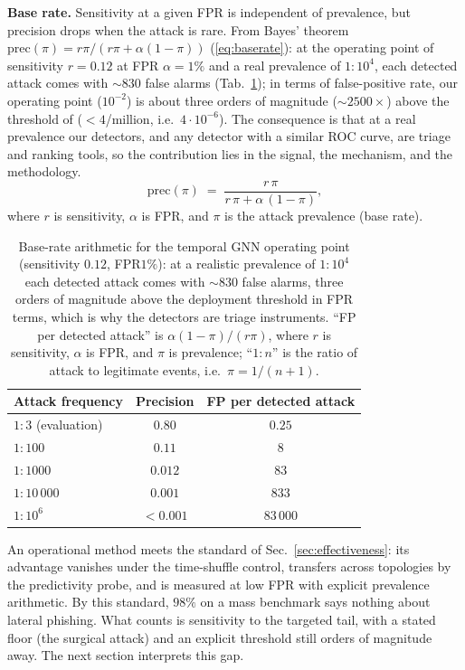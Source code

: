 \smallskip\noindent\textbf{Base rate.} Sensitivity at a given FPR is independent of prevalence, but
precision drops when the attack is rare. From Bayes' theorem
$\mathrm{prec}(\pi)=r\pi/(r\pi+\alpha(1-\pi))$
(\ref{eq:baserate}): at the operating point of sensitivity $r{=}0.12$ at FPR $\alpha{=}1\%$ and a real prevalence of
$1{:}10^4$, each detected attack comes with $\sim\!830$ false alarms (Tab.~\ref{tab:baserate}); in terms of
false-positive rate, our operating point ($10^{-2}$) is about three orders of magnitude ($\sim\!2500\times$)
above the threshold of \citet{ho2019detecting} ($<\!4$/million, i.e.\ $4\cdot10^{-6}$). The consequence is that at a real
prevalence our detectors, and any detector with a similar ROC curve, are triage and ranking tools, so the contribution lies in the signal, the mechanism, and the methodology.
\begin{equation}
\mathrm{prec}(\pi) \;=\; \frac{r\,\pi}{r\,\pi + \alpha\,(1-\pi)},
\label{eq:baserate}
\end{equation}
where $r$ is sensitivity, $\alpha$ is FPR, and $\pi$ is the attack prevalence (base rate).

\begin{table}[pos=tbp]\centering
\begin{tabular}{lcc}
\toprule
Attack frequency & Precision & FP per detected attack \\
\midrule
$1{:}3$ (evaluation) & $0.80$ & $0.25$ \\
$1{:}100$           & $0.11$ & $8$        \\
$1{:}1000$          & $0.012$ & $83$      \\
$1{:}10\,000$       & $0.001$ & $833$     \\
$1{:}10^6$          & $<\!0.001$ & $83\,000$ \\
\bottomrule
\end{tabular}
\caption{Base-rate arithmetic for the temporal GNN operating point (sensitivity $0.12$, FPR$1\%$): at a
realistic prevalence of $1{:}10^4$ each detected attack comes with $\sim\!830$ false alarms, three orders of
magnitude above the deployment threshold in FPR terms, which is why the detectors are triage instruments. ``FP per
detected attack'' is $\alpha(1-\pi)/(r\pi)$, where $r$ is sensitivity, $\alpha$ is FPR, and $\pi$ is
prevalence; ``$1{:}n$'' is the ratio of attack to legitimate events, i.e.\ $\pi=1/(n{+}1)$.}
\label{tab:baserate}
\end{table}

\noindent An operational method meets the standard of Sec.~\ref{sec:effectiveness}: its advantage vanishes
under the time-shuffle control, transfers across topologies by the predictivity probe, and is measured at low
FPR with explicit prevalence arithmetic. By this standard, $98\%$ on a mass benchmark says nothing about lateral
phishing. What counts is sensitivity to the targeted tail, with a stated floor (the surgical attack) and an
explicit threshold still orders of magnitude away. The next section interprets this gap.

